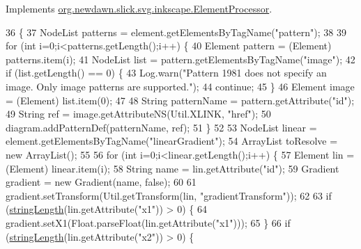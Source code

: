 Implements \mbox{\hyperlink{interfaceorg_1_1newdawn_1_1slick_1_1svg_1_1inkscape_1_1_element_processor_acd170a9e1119481edae885780db59a2e}{org.\+newdawn.\+slick.\+svg.\+inkscape.\+Element\+Processor}}.


\begin{DoxyCode}
36                                                                                                            
                 \{
37         NodeList patterns = element.getElementsByTagName(\textcolor{stringliteral}{"pattern"});
38         
39         \textcolor{keywordflow}{for} (\textcolor{keywordtype}{int} i=0;i<patterns.getLength();i++) \{
40             Element pattern = (Element) patterns.item(i);
41             NodeList list = pattern.getElementsByTagName(\textcolor{stringliteral}{"image"});
42             \textcolor{keywordflow}{if} (list.getLength() == 0) \{
43                 Log.warn(\textcolor{stringliteral}{"Pattern 1981 does not specify an image. Only image patterns are supported."});
44                 \textcolor{keywordflow}{continue};
45             \}
46             Element image = (Element) list.item(0);
47             
48             String patternName = pattern.getAttribute(\textcolor{stringliteral}{"id"});
49             String ref = image.getAttributeNS(Util.XLINK, \textcolor{stringliteral}{"href"});
50             diagram.addPatternDef(patternName, ref);
51         \}
52         
53         NodeList linear = element.getElementsByTagName(\textcolor{stringliteral}{"linearGradient"});
54         ArrayList toResolve = \textcolor{keyword}{new} ArrayList();
55         
56         \textcolor{keywordflow}{for} (\textcolor{keywordtype}{int} i=0;i<linear.getLength();i++) \{
57             Element lin = (Element) linear.item(i);
58             String name = lin.getAttribute(\textcolor{stringliteral}{"id"});
59             Gradient gradient = \textcolor{keyword}{new} Gradient(name, \textcolor{keyword}{false});
60 
61             gradient.setTransform(Util.getTransform(lin, \textcolor{stringliteral}{"gradientTransform"}));
62             
63             \textcolor{keywordflow}{if} (\mbox{\hyperlink{classorg_1_1newdawn_1_1slick_1_1svg_1_1inkscape_1_1_defs_processor_ab7a770c192ded7ccb0655791369c2475}{stringLength}}(lin.getAttribute(\textcolor{stringliteral}{"x1"})) > 0) \{
64                 gradient.setX1(Float.parseFloat(lin.getAttribute(\textcolor{stringliteral}{"x1"})));
65             \}
66             \textcolor{keywordflow}{if} (\mbox{\hyperlink{classorg_1_1newdawn_1_1slick_1_1svg_1_1inkscape_1_1_defs_processor_ab7a770c192ded7ccb0655791369c2475}{stringLength}}(lin.getAttribute(\textcolor{stringliteral}{"x2"})) > 0) \{

\end{DoxyCode}
